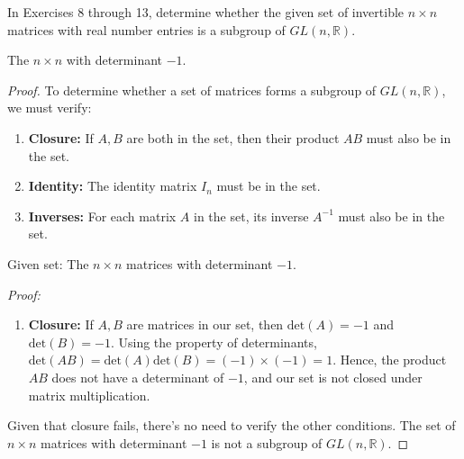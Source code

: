 \documentclass[12pt]{amsart}
\theoremstyle{definition}
\numberwithin{equation}{section}
\theoremstyle{plain}
\newcommand{\R}{\mathbb{R}}
\begin{document}
    \begin{exercise}{11} 
        In Exercises 8 through 13, determine whether the given set of invertible $n \times n$ matrices with real number entries is a subgroup of $GL(n,\R)$.

        The $n \times n$ with determinant $-1$.
    \begin{proof}
        To determine whether a set of matrices forms a subgroup of \( GL(n, \R) \), we must verify:
        \begin{enumerate}
            \item \textbf{Closure:} If \( A, B \) are both in the set, then their product \( AB \) must also be in the set.
            \item \textbf{Identity:} The identity matrix \( I_n \) must be in the set.
            \item \textbf{Inverses:} For each matrix \( A \) in the set, its inverse \( A^{-1} \) must also be in the set.
           \end{enumerate}
            Given set: The \( n \times n \) matrices with determinant \(-1\).

\textit{Proof:}

\begin{enumerate}
    \item \textbf{Closure:} If \( A, B \) are matrices in our set, then \( \text{det}(A) = -1 \) and \( \text{det}(B) = -1 \). Using the property of determinants, \( \text{det}(AB) = \text{det}(A) \text{det}(B) = (-1) \times (-1) = 1 \). Hence, the product \( AB \) does not have a determinant of \(-1\), and our set is not closed under matrix multiplication.
\end{enumerate}
Given that closure fails, there's no need to verify the other conditions. The set of \( n \times n \) matrices with determinant \(-1\) is not a subgroup of \( GL(n, \R) \).
    \end{proof}
    \end{exercise}
            
\end{document}

